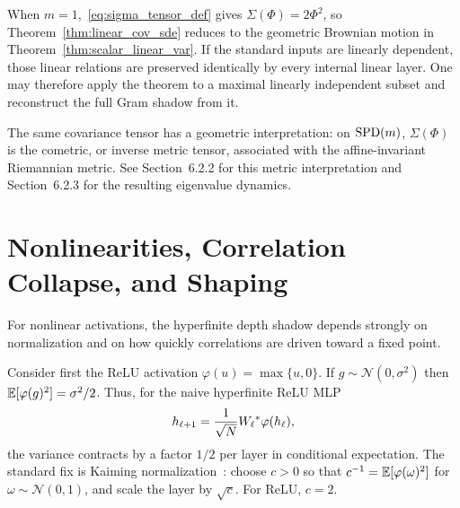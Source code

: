 When $m = 1$,~\eqref{eq:sigma_tensor_def} gives $\Sigma(\Phi) = 2\Phi^2$, so Theorem~\ref{thm:linear_cov_sde} reduces to the geometric Brownian motion in Theorem~\ref{thm:scalar_linear_var}. If the standard inputs are linearly dependent, those linear relations are preserved identically by every internal linear layer. One may therefore apply the theorem to a maximal linearly independent subset and reconstruct the full Gram shadow from it.

The same covariance tensor has a geometric interpretation: on $\operatorname{SPD}(m)$, $\Sigma(\Phi)$ is the cometric, or inverse metric tensor, associated with the affine-invariant Riemannian metric. See Section~6.2.2 for this metric interpretation and Section~6.2.3 for the resulting eigenvalue dynamics.

\section{Nonlinearities, Correlation Collapse, and Shaping}\label{sec:shaping}

For nonlinear activations, the hyperfinite depth shadow depends strongly on normalization and on how quickly correlations are driven toward a fixed point.

Consider first the ReLU activation $\varphi(u) = \max\{u, 0\}$. If $g \sim \mathcal{N}(0, \sigma^2)$ then $\mathbb{E}[\varphi(g)^2] = \sigma^2/2$. Thus, for the naive hyperfinite ReLU MLP
\begin{equation}\label{eq:naive_relu_mlp}
h_{\ell+1} = \frac{1}{\sqrt{N}} W_\ell {}^*\varphi(h_\ell),
\end{equation}
the variance contracts by a factor $1/2$ per layer in conditional expectation. The standard fix is Kaiming normalization~\cite{he2015delving}: choose $c > 0$ so that $c^{-1} = \mathbb{E}[\varphi(\omega)^2]$ for $\omega \sim \mathcal{N}(0, 1)$, and scale the layer by $\sqrt{c}$. For ReLU, $c = 2$.

